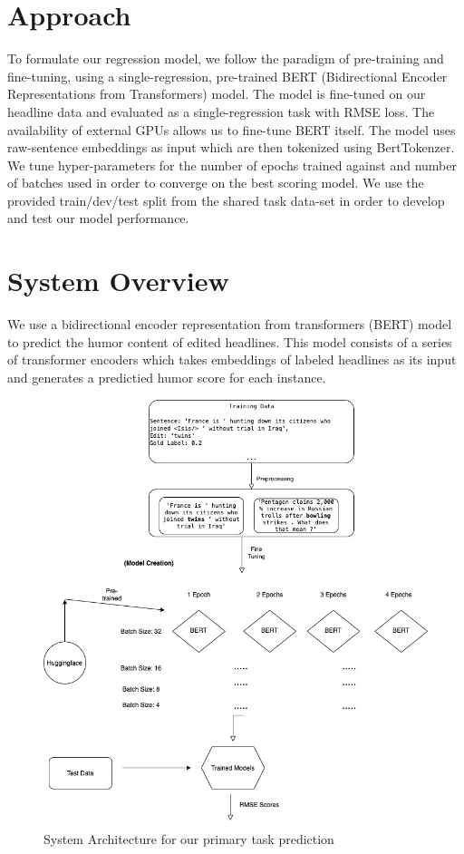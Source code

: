 \documentclass{article}
\begin{document}
\section{Approach}
To formulate our regression model, we follow the paradigm of pre-training and fine-tuning, using a single-regression, pre-trained BERT (Bidirectional Encoder Representations from Transformers) model. The model is fine-tuned on our headline data and evaluated as a single-regression task with RMSE loss. The availability of external GPUs allows us to fine-tune BERT itself. The model uses raw-sentence embeddings as input which are then tokenized using BertTokenzer. We tune hyper-parameters for the number of epochs trained against and number of batches used in order to converge on the best scoring model.  We use the provided train/dev/test split from the shared task data-set in order to develop and test our model performance.


\section{System Overview}

We use a bidirectional encoder representation from transformers (BERT) model to predict the humor content of edited headlines. This model \cite{DBLP:journals/corr/abs-1810-04805} consists of a series of transformer encoders which takes embeddings of labeled headlines as its input and generates a predictied humor score for each instance.

\begin{figure}
\includegraphics[scale=0.25]{classifier.jpg}
\caption{System Architecture for our primary task prediction}
\end{figure}
\end{document}
